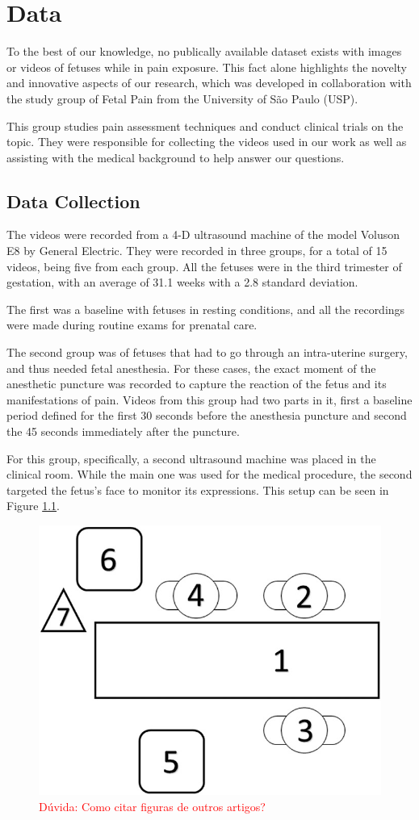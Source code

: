 \chapter{Data}

To the best of our knowledge, no publically available dataset exists with images or videos of fetuses while in pain exposure. This fact alone highlights the novelty and innovative aspects of our research, which was developed in collaboration with the study group of Fetal Pain from the University of São Paulo (USP). 

This group studies pain assessment techniques and conduct clinical trials on the topic. They were responsible for collecting the videos used in our work as well as assisting with the medical background to help answer our questions.

\section{Data Collection}

The videos were recorded from a 4-D ultrasound machine of the model Voluson E8 by General Electric. They were recorded in three groups, for a total of 15 videos, being five from each group. All the fetuses were in the third trimester of gestation, with an average of 31.1 weeks with a 2.8 standard deviation.

The first was a baseline with fetuses in resting conditions, and all the recordings were made during routine exams for prenatal care.

The second group was of fetuses that had to go through an intra-uterine surgery, and thus needed fetal anesthesia. For these cases, the exact moment of the anesthetic puncture was recorded to capture the reaction of the fetus and its manifestations of pain. Videos from this group had two parts in it, first a baseline period defined for the first 30 seconds before the anesthesia puncture and second the 45 seconds immediately after the puncture.

For this group, specifically, a second ultrasound machine was placed in the clinical room. While the main one was used for the medical procedure, the second targeted the fetus's face to monitor its expressions. This setup can be seen in Figure \ref{fig:ultrasound}.

\begin{figure}[h!tp]
    \centering
    \includegraphics[width=.35\textwidth]{imgs/chap03_ultrasound_setup.jpg}
    \caption{\textcolor{red}{Dúvida: Como citar figuras de outros artigos?}}
    \label{fig:ultrasound}
\end{figure}

